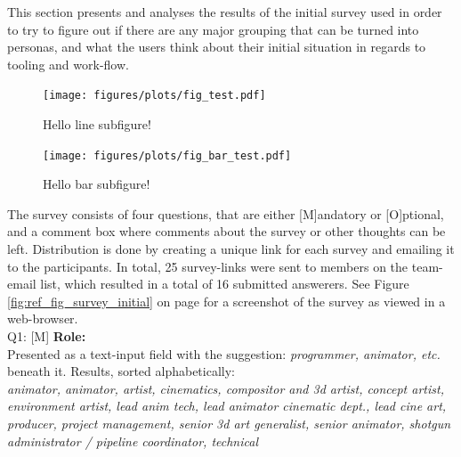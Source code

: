   This section presents and analyses the results of the initial survey used in
  order to try to figure out if there are any major grouping that can be turned
  into personas, and what the users think about their initial situation in
  regards to tooling and work-flow.

  \begin{minipage}[b]{0.44\textwidth}
    \begin{figure}[H]
      \centering
        \texttt{[image: figures/plots/fig\_test.pdf]}
        \caption{Hello line subfigure!}
      \end{figure}
  \end{minipage}
  \begin{minipage}[b]{0.49\textwidth}
    \begin{figure}[H]
      \texttt{[image: figures/plots/fig\_bar\_test.pdf]}
      \caption{Hello bar subfigure!}
    \end{figure}
  \end{minipage}


  \vspace{0.2cm}
  The survey consists of four questions, that are either [M]andatory or
  [O]ptional, and a comment box where comments about the survey or other
  thoughts can be left. Distribution is done by creating a unique link for each
  survey and emailing it to the participants. In total, 25 survey-links were
  sent to members on the team-email list, which resulted in a total of 16
  submitted answerers. See Figure \ref{fig:ref_fig_survey_initial} on page
  \pageref{fig:ref_fig_survey_initial} for a screenshot of
  the survey as viewed in a web-browser.\\

  Q1: [M] \textbf{Role:} \\ Presented as a text-input field with the suggestion: \textit{programmer,
    animator, etc.} beneath it. Results, sorted alphabetically:  \\
  \textit{
    animator, animator, artist, cinematics, compositor and 3d artist, concept
    artist, environment artist, lead anim tech, lead animator cinematic dept., lead
    cine art, producer, project management, senior 3d art generalist, senior
    animator, shotgun administrator / pipeline coordinator, technical
  } \\


